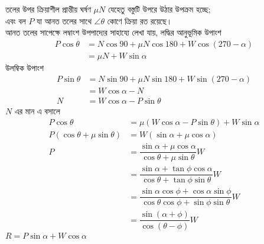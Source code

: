 \documentclass{article}
\begin{document}
তলের উপর ক্রিয়াশীল প্রান্তীয় ঘর্ষণ $\mu N$ যেহেতু বস্তুটি উপরে উঠার উপক্রম হচ্ছে;\\
এবং বল $P$ যা আনত তলের সাথে $\angle \theta$ কোণে ক্রিয়া রত রয়েছে।\\
আনত তলের সাপেক্ষে লম্বাংশ উপপাদ্যের সাহায্যে লেখা যায়, লদ্ধির আনুভূমিক উপাংশ
\begin{equation}
\begin{split}
P\cos \theta &=N\cos 90 +\mu N \cos 180 + W\cos (270-\alpha) \\&= \mu N  + W\sin \alpha 
\end{split}
\end{equation} 
 উলম্বিক উপাংশ
\begin{equation}
\begin{split}
P\sin \theta &=N\sin 90 +\mu N \sin 180 + W\sin (270-\alpha) \\&=  W\cos \alpha -N \\N &= W\cos \alpha - P\sin \theta  
\end{split}
\end{equation} 
$N$ এর মান এ বসালে\\
\begin{equation}
\begin{split}
P\cos \theta &= \mu (W\cos \alpha - P\sin \theta)  + W\sin \alpha\\P (\cos \theta + \mu\sin \theta) &= W(\sin\alpha + \mu\cos \alpha)\\P &= \dfrac{\sin \alpha + \mu\cos\alpha}{\cos\theta + \mu \sin\theta}W\\&=  \dfrac{\sin \alpha + \tan \phi \cos\alpha}{\cos\theta + \tan\phi \sin\theta}W\\&= \dfrac{\sin \alpha\cos\phi + \cos\alpha\sin\phi}{\cos\theta\cos\phi + \sin\phi \sin\theta}W\\&= \dfrac{\sin (\alpha +\phi)}{\cos(\theta -\phi)}W
\end{split}
\end{equation} 
$R = P\sin \alpha +W \cos \alpha$
\end{document}
